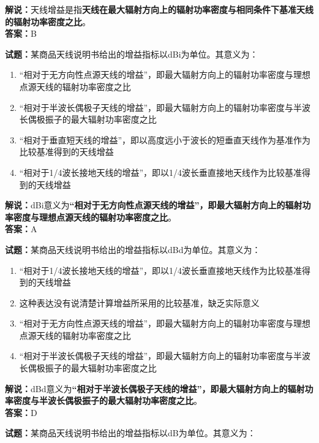 \documentclass{ctexbook}
\begin{document}
\noindent\textbf{解说：}天线增益是指\textbf{天线在最大辐射方向上的辐射功率密度与相同条件下基准天线的辐射功率密度之比}。\\\noindent\textbf{答案：}B


\bigskip


\noindent\textbf{试题：}某商品天线说明书给出的增益指标以dBi为单位。其意义为：
\begin{enumerate}[leftmargin=3em]
	\item “相对于无方向性点源天线的增益”，即最大辐射方向上的辐射功率密度与理想点源天线的辐射功率密度之比
	\item “相对于半波长偶极子天线的增益”，即最大辐射方向上的辐射功率密度与半波长偶极振子的最大辐射功率密度之比
	\item “相对于垂直短天线的增益”，即以高度远小于波长的短垂直天线作为基准作为比较基准得到的天线增益
	\item “相对于1/4波长接地天线的增益”，即以1/4波长垂直接地天线作为比较基准得到的天线增益
\end{enumerate}

\noindent\textbf{解说：}dBi意义为\textbf{“相对于无方向性点源天线的增益”，即最大辐射方向上的辐射功率密度与理想点源天线的辐射功率密度之比}。\\\noindent\textbf{答案：}A


\bigskip


\noindent\textbf{试题：}某商品天线说明书给出的增益指标以dBd为单位。其意义为：

\begin{enumerate}[leftmargin=3em]
	\item “相对于1/4波长接地天线的增益”，即以1/4波长垂直接地天线作为比较基准得到的天线增益
	\item 这种表达没有说清楚计算增益所采用的比较基准，缺乏实际意义
	\item “相对于无方向性点源天线的增益”，即最大辐射方向上的辐射功率密度与理想点源天线的辐射功率密度之比
	\item “相对于半波长偶极子天线的增益”，即最大辐射方向上的辐射功率密度与半波长偶极振子的最大辐射功率密度之比
\end{enumerate}

\noindent\textbf{解说：}dBd意义为\textbf{“相对于半波长偶极子天线的增益”，即最大辐射方向上的辐射功率密度与半波长偶极振子的最大辐射功率密度之比}。\\\noindent\textbf{答案：}D


\bigskip


\noindent\textbf{试题：}某商品天线说明书给出的增益指标以dB为单位。其意义为：
\end{document}
